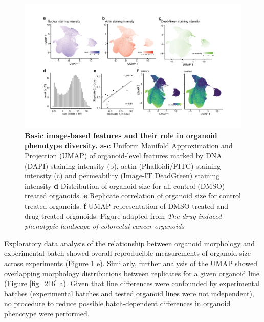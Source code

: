 \begin{flushleft}
\begin{figure}[h]
\centering
\includegraphics[width=\textwidth,
                height=\textheight,
                keepaspectratio]{figures/promise/pdf/fig_1_5.pdf}
\caption[Basic image-based features and their role in organoid phenotype diversity]{\textbf{Basic image-based features and their role in organoid phenotype diversity. a-c} Uniform Manifold Approximation and Projection (UMAP) of organoid-level features marked by DNA (DAPI) staining intensity (b), actin (Phalloidi/FITC) staining intensity (c) and permeability (Image-IT DeadGreen) staining intensity \textbf{d} Distribution of organoid size for all control (DMSO) treated organoids. \textbf{e} Replicate correlation of organoid size for control treated organoids. \textbf{f} UMAP representation of DMSO treated and drug treated organoids. Figure adapted from \textit{The drug-induced phenotypic landscape of colorectal cancer organoids} \parencite{betgeDruginducedPhenotypicLandscape2022}}
\label{fig_145}
\end{figure}
\bigbreak

Exploratory data analysis of the relationship between organoid morphology and experimental batch showed overall reproducible measurements of organoid size across experiments (Figure \ref{fig_145} e). Similarly, further analysis of the UMAP showed overlapping morphology distributions between replicates for a given organoid line (Figure \ref{fig_216} a). Given that line differences were confounded by experimental batches (experimental batches and tested organoid lines were not independent), no procedure to reduce possible batch-dependent differences in organoid phenotype were performed. 

\bigbreak


\end{flushleft}
